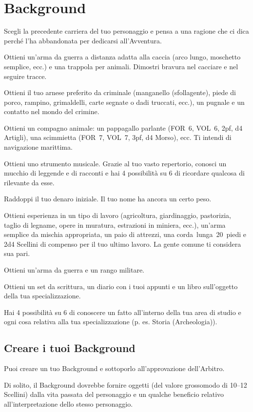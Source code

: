 \documentclass[itdr]{subfiles}
\begin{document}
\clearpage

\vfill
\section{Background}

Scegli la precedente carriera del tuo personaggio e pensa a una ragione che ci dica perché l’ha abbandonata per dedicarsi all'\mbox{Avventura}.

\vfill
{}
Ottieni un’arma da guerra a distanza adatta alla caccia (arco lungo, moschetto semplice, ecc.) e una trappola per animali. Dimostri bravura nel cacciare e nel seguire tracce.

\vfill
{}
Ottieni il tuo arnese preferito da criminale (manganello (sfollagente), piede di porco, rampino, grimaldelli, carte segnate o dadi truccati, ecc.), un pugnale e un contatto nel mondo del crimine.

\vfill
{}
Ottieni un compagno animale: un pappagallo parlante (FOR~6, VOL~6, 2pf, d4 Artigli), una scimmietta (FOR~7, VOL~7, 3pf, d4 Morso), ecc. Ti intendi di navigazione marittima.

\vfill
{}
Ottieni uno strumento musicale. Grazie al tuo vasto repertorio, conosci un mucchio di leggende e di racconti e hai 4 possibilità su 6 di ricordare qualcosa di rilevante da esse.

\vfill
{}
Raddoppi il tuo denaro iniziale. Il tuo nome ha ancora un certo peso.

\vfill
{}
Ottieni esperienza in un tipo di lavoro (agricoltura, giardinaggio, pastorizia, taglio di legname, opere in muratura, estrazioni in miniera, ecc.), un’arma semplice da mischia appropriata, un paio di attrezzi, una \mbox{corda lunga 20 piedi} e 2d4 Scellini di compenso per il tuo ultimo lavoro. La gente \mbox{comune} ti considera sua pari.

\vfill
{}
Ottieni un’arma da guerra e un rango militare.

\vfill
{}
Ottieni un set da scrittura, un diario con i tuoi appunti e un libro sull’oggetto della tua specializzazione.

Hai 4 possibilità su 6 di conoscere un fatto all’interno della tua area di studio e ogni cosa relativa alla tua specializzazione (p. es. Storia (Archeologia)).

\vspace{5ex}
\break

\vfill
\begin{dbox}
\subsection*{Creare i tuoi Background}

Puoi creare un tuo Background e sottoporlo all’approvazione dell’Arbitro.

Di solito, il Background dovrebbe fornire oggetti (del valore grossomodo di 10--12 Scellini) dalla vita passata del personaggio e un qualche beneficio relativo all’interpretazione dello stesso personaggio.
\end{dbox}
\end{document}
